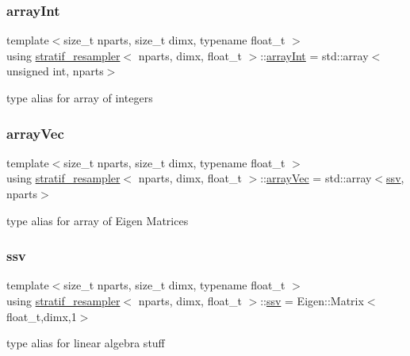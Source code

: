 \subsubsection{\texorpdfstring{array\+Int}{arrayInt}}
{\footnotesize\ttfamily template$<$size\+\_\+t nparts, size\+\_\+t dimx, typename float\+\_\+t $>$ \\
using \hyperlink{classstratif__resampler}{stratif\+\_\+resampler}$<$ nparts, dimx, float\+\_\+t $>$\+::\hyperlink{classstratif__resampler_a6feed5616bbd45f1bcf155fdf6348e19}{array\+Int} =  std\+::array$<$unsigned int, nparts$>$}

type alias for array of integers \mbox{\label{classstratif__resampler_aafc4c3078fcc2912b41ad76465d86491}} 
\subsubsection{\texorpdfstring{array\+Vec}{arrayVec}}
{\footnotesize\ttfamily template$<$size\+\_\+t nparts, size\+\_\+t dimx, typename float\+\_\+t $>$ \\
using \hyperlink{classstratif__resampler}{stratif\+\_\+resampler}$<$ nparts, dimx, float\+\_\+t $>$\+::\hyperlink{classrbase_aa12fc826befa6ba0647b5f59ebc396ee}{array\+Vec} =  std\+::array$<$\hyperlink{classrbase_ae20e0b8df15aa109252f57ecbf1f20f8}{ssv}, nparts$>$}

type alias for array of Eigen Matrices \mbox{\label{classstratif__resampler_a9b8a1de85ef718528f4c889678a9331f}} 
\subsubsection{\texorpdfstring{ssv}{ssv}}
{\footnotesize\ttfamily template$<$size\+\_\+t nparts, size\+\_\+t dimx, typename float\+\_\+t $>$ \\
using \hyperlink{classstratif__resampler}{stratif\+\_\+resampler}$<$ nparts, dimx, float\+\_\+t $>$\+::\hyperlink{classrbase_ae20e0b8df15aa109252f57ecbf1f20f8}{ssv} =  Eigen\+::\+Matrix$<$float\+\_\+t,dimx,1$>$}

type alias for linear algebra stuff 

